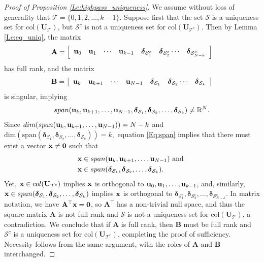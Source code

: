 \documentclass[journal, 10pt]{IEEEtran}
\begin{document}
\begin{proof}[Proof of Proposition \ref{Le:highpass_uniqueness}]
We assume without loss of generality that ${\mathcal T}=\{0,1,2,\ldots,k-1\}$. 
Suppose first that the set $\mathcal{S}$ is a uniqueness set for $\mbox{col}({\mathbf{U}}_{\mathcal T})$, but $\mathcal{S}^c$ is not a uniqueness set for $\mbox{col}({\mathbf{U}}_{{\mathcal T}^c})$. Then by Lemma \ref{Le:eq_uniq}, the matrix $$\mathbf{A}=
 \left[ \begin{array}{cccccccc}
{\bf u}_{0} & {\bf u}_{1} & \cdots & {\bf u}_{k-1} & {\boldsymbol \delta}_{{\mathcal{S}}^c_1} & {\boldsymbol \delta}_{{\mathcal{S}}^c_2} \cdots & {\boldsymbol \delta}_{{\mathcal{S}}^c_{N-k}} \end{array} \right]$$
has full rank, and the matrix $$\mathbf{B}=
 \left[ \begin{array}{cccccccc}
{\bf u}_{k} & {\bf u}_{k+1} & \cdots & {\bf u}_{N-1} & {\boldsymbol \delta}_{\mathcal{S}_{1}} & {\boldsymbol \delta}_{\mathcal{S}_{2}} \cdots & {\boldsymbol \delta}_{\mathcal{S}_k} \end{array} \right]$$
is singular, implying
\begin{align}\label{Eq:span}
\mbox{span}({\bf u}_{k}, {\bf u}_{k+1},\ldots, {\bf u}_{N-1}, {\boldsymbol \delta}_{\mathcal{S}_{1}}, {\boldsymbol \delta}_{\mathcal{S}_{2}}, \ldots, {\boldsymbol \delta}_{\mathcal{S}_k}) \neq \mathbb{R}^N.
\end{align}
Since 
$\mbox{dim}(\mbox{span}({\bf u}_{k}, {\bf u}_{k+1},\ldots, {\bf u}_{N-1}))=N-k$ and $\mbox{dim}(\mbox{span}({\boldsymbol \delta}_{S_{1}}, {\boldsymbol \delta}_{S_{2}}, \ldots, {\boldsymbol \delta}_{\mathcal{S}_k}))=k,$ equation 
\eqref{Eq:span} implies that
there must exist a vector ${\bf x} \neq {\bf 0}$ such that 
\begin{align*}
&{\bf x} \in  \mbox{span}({\bf u}_{k}, {\bf u}_{k+1},\ldots, {\bf u}_{N-1})  \hbox{ and } \\
& {\bf x} \in \mbox{span}({\boldsymbol \delta}_{\mathcal{S}_{1}}, {\boldsymbol \delta}_{\mathcal{S}_{2}}, \ldots, {\boldsymbol \delta}_{\mathcal{S}_{k}}).\end{align*}
Yet, ${\bf x} \in \mbox{col}({\mathbf{U}}_{{\mathcal T}^c})$ implies ${\bf x}$ is orthogonal to  ${\bf u}_0, {\bf u}_1, \ldots, {\bf u}_{k-1}$, and, similarly, 
${\bf x} \in \mbox{span}({\boldsymbol \delta}_{\mathcal{S}_{1}}, {\boldsymbol \delta}_{\mathcal{S}_{2}}, \ldots, {\boldsymbol \delta}_{\mathcal{S}_{k}})$ implies ${\bf x}$ is orthogonal to ${\boldsymbol \delta}_{\mathcal{S}^c_{1}}, {\boldsymbol \delta}_{\mathcal{S}^c_{2}}, \ldots, {\boldsymbol \delta}_{\mathcal{S}^c_{N-k}}.$
In matrix notation, we have $\mathbf{A}^{\top}{\bf x}={\bf 0}$, so $\mathbf{A}^{\top}$ has a non-trivial null space, and thus the square matrix $\mathbf{A}$ is not full rank and $\mathcal{S}$ is not a uniqueness set for $\mbox{col}({\mathbf{U}}_{\mathcal T})$, a contradiction. We conclude that if $\mathbf{A}$ is full rank, then $\mathbf{B}$ must be full rank and $\mathcal{S}^c$ is a uniqueness set for $\mbox{col}({\mathbf{U}}_{{\mathcal T}^c})$, completing the proof of sufficiency. Necessity follows from the same argument, with the roles of $\mathbf{A}$ and $\mathbf{B}$ interchanged.
\end{proof}
\end{document}

